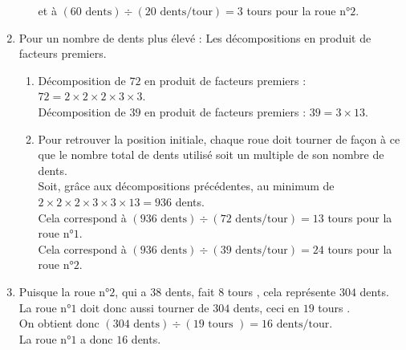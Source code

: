 \begin{corrige}
\begin{enumerate}
\begin{enumerate}
                    et à $(60\text{ dents})\div (20\text{ dents/tour}) = 3$ tours pour la roue n°$2$.
                \end{enumerate}            
            \setcounter{enumi}{1}
            \item Pour un nombre de dents plus élevé : Les décompositions en produit de facteurs premiers.\\
                \begin{enumerate}
                    \item Décomposition de $72$ en produit de facteurs premiers :  $72 = 2\times2\times2\times3\times3$.\\
                    Décomposition de $39$ en produit de facteurs premiers :  $39 = 3\times13$.
                \medskip
                    \item Pour retrouver la position initiale,
                    chaque roue doit tourner de façon à ce que le nombre total de dents utilisé soit un multiple de son nombre
                    de dents.\\
                    Soit, grâce aux décompositions précédentes, au minimum de $2\times2\times2\times3\times3\times13 = 936$ dents.\\
                    Cela correspond à $(936\text{ dents})\div (72\text{ dents/tour}) = 13$ tours pour la roue n°$1$.\\
                    Cela correspond à $(936\text{ dents})\div (39\text{ dents/tour}) = 24$ tours pour la roue n°$2$.
                \end{enumerate}
            \setcounter{enumi}{2}                
            \item Puisque la roue n°$2$, qui a $38$ dents, fait $8$  tours , cela représente $304$ dents.\\
            La roue n°$1$ doit donc aussi tourner de $304$ dents, ceci en $19$  tours .\\
            On obtient donc $(304\text{ dents})\div (19\text{ tours }) = 16 \text{ dents/tour}.$\\
            La roue n°$1$ a donc $16$ dents.
        \end{enumerate}
\end{corrige}

